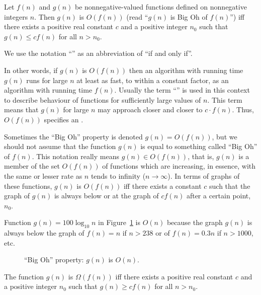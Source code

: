 \begin{Definition} [Big Oh]
\label{def:oh}
Let $f(n)$ and $g(n)$ be nonnegative-valued functions defined on
nonnegative integers $n$. Then $g(n)$ is $O(f(n))$ (read ``\(g(n)\) is
Big Oh of \(f(n)\)'') iff there exists 
a positive real constant $c$ and
a positive integer $n_{0}$ such that $g(n) \le c f(n)$ for all $n>n_{0}$.
\end{Definition}
\begin{note} 
We use the notation ``'' as an abbreviation of ``if and only if''.
\end{note}
In other words, if $g(n)$ is $O(f(n))$ then an algorithm with running time 
$g(n)$ runs for large $n$ at least as fast, to within a
constant factor, as an algorithm with running time  $f(n)$. Usually
the term ``'' is used in this context to describe 
behaviour of functions for sufficiently large values of $n$. This term 
means that \(g(n)\) for large \(n\) may approach closer and closer to 
\(c\cdot f(n)\). Thus, \(O(f(n))\) specifies
an .
\begin{note} 
Sometimes the ``Big Oh'' property is denoted $g(n)=O(f(n))$, but
we should not assume that the function $g(n)$ is equal to something 
called ``Big Oh'' of $f(n)$. This notation really means $g(n) \in O(f(n))$, 
that is, \(g(n)\) is a member of the set $O(f(n))$ 
of functions which are increasing, in essence, with the same 
or lesser rate as  \(n\) tends to infinity ($n \rightarrow \infty$). 
In terms of graphs of these functions, $g(n)$ is $O(f(n))$ iff
there exists a constant $c$ such that the graph of $g(n)$ is always
below or at the graph of $cf(n)$ after a certain point, $n_{0}$. 
\end{note}

\begin{Example}
Function \(g(n)=100\log_{10}n\) in Figure~\ref{f:aa-graphs} 
is \(O(n)\) because the graph \(g(n)\) is always below
the graph of \(f(n)=n\) if \(n > 238\) or of \(f(n)=0.3n\)
if \(n > 1000\), etc. 
\end{Example}

\begin{figure}[htb!]
\centerline{
}
\caption{``Big Oh'' property: $g(n)$ is $O(n)$.}
\label{f:aa-graphs}
\end{figure}
\begin{Definition} 
\label{def:omega}
The function $g(n)$ is $\Omega(f(n))$ iff 
there exists a positive real constant $c$ and a 
positive integer $n_{0}$  
such that $g(n) \ge c f(n)$ for all $n>n_{0}$.
\end{Definition} 

